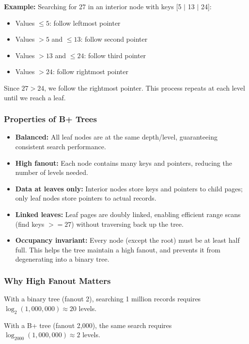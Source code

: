 \textbf{Example:} Searching for 27 in an interior node with keys [5 $|$ 13 $|$ 24]:
\begin{itemize}
    \item Values $\leq 5$: follow leftmost pointer
    \item Values $> 5$ and $\leq 13$: follow second pointer
    \item Values $> 13$ and $\leq 24$: follow third pointer
    \item Values $> 24$: follow rightmost pointer
\end{itemize}

Since $27 > 24$, we follow the rightmost pointer. This process repeats at each level until we reach a leaf.

\subsubsection*{Properties of B+ Trees}

\begin{itemize}
    \item \textbf{Balanced:} All leaf nodes are at the same depth/level, guaranteeing consistent search performance.
    \item \textbf{High fanout:} Each node contains many keys and pointers, reducing the number of levels needed.
    \item \textbf{Data at leaves only:} Interior nodes store keys and pointers to child pages; only leaf nodes store pointers to actual records.
    \item \textbf{Linked leaves:} Leaf pages are doubly linked, enabling efficient range scans (find keys $>= 27$) without traversing back up the tree.
    \item \textbf{Occupancy invariant:} Every node (except the root) must be at least half full. This helps the tree maintain a high fanout, and prevents it from degenerating into a binary tree.
\end{itemize}

\subsubsection*{Why High Fanout Matters}

With a binary tree (fanout 2), searching 1 million records requires $\log_2(1{,}000{,}000) \approx 20$ levels.

With a B+ tree (fanout 2,000), the same search requires $\log_{2000}(1{,}000{,}000) \approx 2$ levels.

